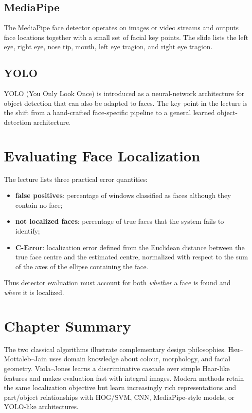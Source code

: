 \documentclass[11pt,a4paper,oneside]{report}
\begin{document}
\subsection{MediaPipe}

The MediaPipe face detector operates on images or video streams and outputs face
locations together with a small set of facial key points.  The slide lists the
left eye, right eye, nose tip, mouth, left eye tragion, and right eye tragion.

\subsection{YOLO}

YOLO (You Only Look Once) is introduced as a neural-network architecture for
object detection that can also be adapted to faces.  The key point in the lecture
is the shift from a hand-crafted face-specific pipeline to a general learned
object-detection architecture.

\section{Evaluating Face Localization}
\label{sec:evaluate-localization}

The lecture lists three practical error quantities:
\begin{itemize}
    \item \textbf{false positives}: percentage of windows classified as faces
          although they contain no face;
    \item \textbf{not localized faces}: percentage of true faces that the system
          fails to identify;
    \item \textbf{C-Error}: localization error defined from the Euclidean distance
          between the true face centre and the estimated centre, normalized with
          respect to the sum of the axes of the ellipse containing the face.
\end{itemize}
Thus detector evaluation must account for both \emph{whether} a face is found and
\emph{where} it is localized.

\section{Chapter Summary}

The two classical algorithms illustrate complementary design philosophies.
Hsu--Mottaleb--Jain uses domain knowledge about colour, morphology, and facial
geometry.  Viola--Jones learns a discriminative cascade over simple Haar-like
features and makes evaluation fast with integral images.  Modern methods retain
the same localization objective but learn increasingly rich representations and
part/object relationships with HOG/SVM, CNN, MediaPipe-style models, or YOLO-like
architectures.
\end{document}
